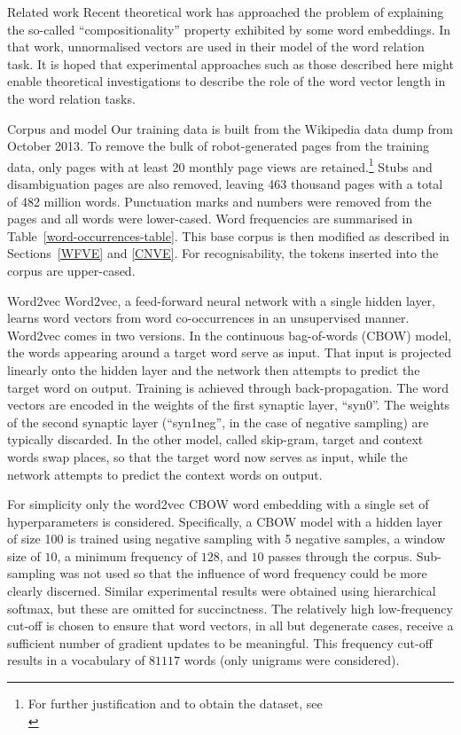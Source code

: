 \documentclass{article} %
\begin{document}
\begin{section}{Related work}
Recent theoretical work \cite{Arora2015} has approached the problem of
explaining the so-called ``compositionality'' property exhibited by some
word embeddings.  In that work, unnormalised vectors are used in their
model of the word relation task.  It is hoped that experimental
approaches such as those described here might enable theoretical
investigations to describe the role of the word vector length in the
word relation tasks.
\end{section}

\begin{section}{Corpus and model}\label{corpus-and-model}
Our training data is built from the Wikipedia data dump from October
2013.  To remove the bulk of robot-generated pages from the training
data, only pages with at least 20 monthly page views are
retained.\footnote{For further justification and to obtain the dataset,
  see\\ \blogpost} Stubs and disambiguation pages are also removed,
leaving 463 thousand pages with a total of 482 million words.
Punctuation marks and numbers were removed from the pages and all words
were lower-cased.  Word frequencies are summarised in
Table~\ref{word-occurrences-table}.  This base corpus is then modified
as described in Sections~\ref{WFVE} and \ref{CNVE}.  For
recognisability, the tokens inserted into the corpus are upper-cased.

\begin{subsection}{Word2vec}\label{word2vec}
Word2vec, a feed-forward neural network with a single hidden layer,
learns word vectors from word co-occurrences in an unsupervised manner.
Word2vec comes in two versions.  In the continuous bag-of-words (CBOW)
model, the words appearing around a target word serve as input.  That
input is projected linearly onto the hidden layer and the network then
attempts to predict the target word on output.  Training is achieved
through back-propagation.  The word vectors are encoded in the weights
of the first synaptic layer, ``syn0''.  The weights of the second
synaptic layer (``syn1neg'', in the case of negative sampling) are
typically discarded.  In the other model, called skip-gram, target and
context words swap places, so that the target word now serves as input,
while the network attempts to predict the context words on output.

For simplicity only the word2vec CBOW word embedding with a single set
of hyperparameters is considered.  Specifically, a CBOW model with a
hidden layer of size 100 is trained using negative sampling with 5
negative samples, a window size of $10$, a minimum frequency of
$128$, and $10$ passes through the corpus.  Sub-sampling was not used so
that the influence of word frequency could be more clearly discerned.
Similar experimental results were obtained using hierarchical softmax,
but these are omitted for succinctness.  The relatively high
low-frequency cut-off is chosen to ensure that word vectors, in all but
degenerate cases, receive a sufficient number of gradient updates to be
meaningful.  This frequency cut-off results in a vocabulary of $81117$
words (only unigrams were considered).


\end{subsection}
\end{section}
\end{document}
